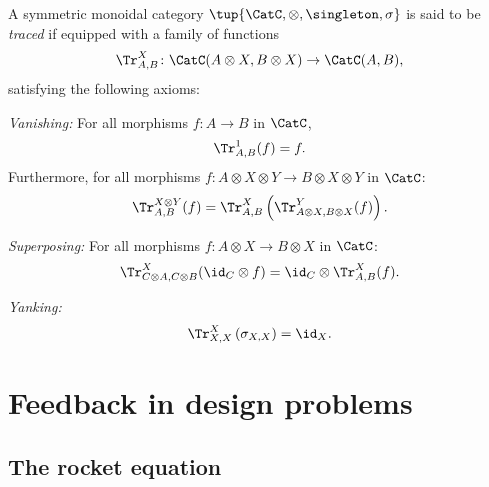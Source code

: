 \begin{ctdefinition}
  A symmetric monoidal category $\tup{\CatC, \otimes, \singleton, \sigma}$ is said to be \emph{traced} if equipped with a family of functions
  \begin{equation}
    \Tr_{A,B}^X\colon \CatC(A\otimes X, B\otimes X)\to \CatC(A,B),
  \end{equation}
  satisfying the following axioms:
  \begin{compactenum}
    \item \emph{Vanishing:} For all morphisms $f\colon A\to B$ in $\CatC$,
    \begin{equation}
      \label{eq:vanishing_1}
      \Tr_{A,B}^1(f)=f.
    \end{equation}
    Furthermore, for all morphisms $f\colon A\otimes X \otimes Y \to B\otimes X \otimes Y$ in $\CatC$:
    \begin{equation}
      \label{eq:vanishing_2}
      \Tr_{A,B}^{X\otimes Y}(f)=\Tr_{A,B}^X\left(
      \Tr_{A\otimes X,B\otimes X}^Y(f)\right).
    \end{equation}
    \item \emph{Superposing:} For all morphisms $f\colon A\otimes X\to B\otimes X$ in $\CatC$:
    \begin{equation}
      \label{eq:superposing}
      \Tr_{C\otimes A,C\otimes B}^{X}(\id_C\otimes f)=\id_C\otimes \Tr_{A,B}^X(f).
    \end{equation}
    \item \emph{Yanking:}
    \begin{equation}
      \label{eq:yanking}
      \Tr_{X,X}^X\left(\sigma_{X,X}\right)=\id_X.
    \end{equation}
  \end{compactenum}
\end{ctdefinition}

\section{Feedback in design problems}
\label{sec:feedbackindesign}

\subsection{The rocket equation}

